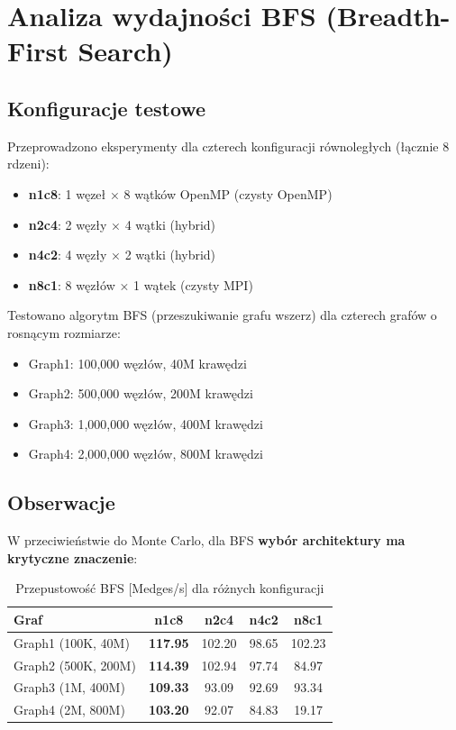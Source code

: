 \section{Analiza wydajności BFS (Breadth-First Search)}

\subsection{Konfiguracje testowe}

Przeprowadzono eksperymenty dla czterech konfiguracji równoległych (łącznie 8 rdzeni):
\begin{itemize}
    \item \textbf{n1c8}: 1 węzeł × 8 wątków OpenMP (czysty OpenMP)
    \item \textbf{n2c4}: 2 węzły × 4 wątki (hybrid)
    \item \textbf{n4c2}: 4 węzły × 2 wątki (hybrid)
    \item \textbf{n8c1}: 8 węzłów × 1 wątek (czysty MPI)
\end{itemize}

Testowano algorytm BFS (przeszukiwanie grafu wszerz) dla czterech grafów o rosnącym rozmiarze:
\begin{itemize}
    \item Graph1: 100,000 węzłów, 40M krawędzi
    \item Graph2: 500,000 węzłów, 200M krawędzi
    \item Graph3: 1,000,000 węzłów, 400M krawędzi
    \item Graph4: 2,000,000 węzłów, 800M krawędzi
\end{itemize}

\subsection{Obserwacje}

W przeciwieństwie do Monte Carlo, dla BFS \textbf{wybór architektury ma krytyczne znaczenie}:

\begin{table}[h]
\centering
\caption{Przepustowość BFS [Medges/s] dla różnych konfiguracji}
\label{tab:bfs_results}
\begin{tabular}{|l|c|c|c|c|}
\hline
\textbf{Graf} & \textbf{n1c8} & \textbf{n2c4} & \textbf{n4c2} & \textbf{n8c1} \\
\hline
Graph1 (100K, 40M)    & \textbf{117.95} & 102.20 & 98.65 & 102.23 \\
Graph2 (500K, 200M)   & \textbf{114.39} & 102.94 & 97.74 & 84.97 \\
Graph3 (1M, 400M)     & \textbf{109.33} & 93.09  & 92.69 & 93.34 \\
Graph4 (2M, 800M)     & \textbf{103.20} & 92.07  & 84.83 & 19.17 \\
\hline
\end{tabular}
\end{table}

